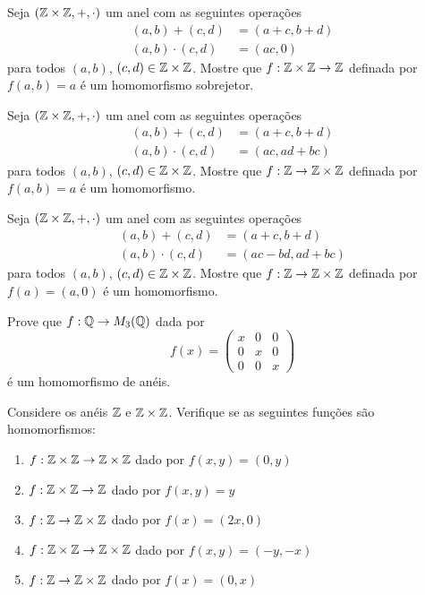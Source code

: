 \documentclass[12pt]{exam}
\begin{document}
\questao{} Seja $(\mathbb{Z}\times\mathbb{Z}, +, \cdot)$ um anel com as seguintes operações
\begin{align*}
	(a, b) + (c, d) &= (a + c, b + d)\\
	(a, b)\cdot (c, d) &= (ac, 0)
\end{align*}
para todos $(a, b)$, $(c, d) \in \mathbb{Z}\times\mathbb{Z}$.
Mostre que $ f : \mathbb{Z}\times\mathbb{Z} \to \mathbb{Z}$ definada por $f(a, b) = a$ é um homomorfismo sobrejetor.

\vspace{.3cm}

\questao{} Seja $(\mathbb{Z}\times\mathbb{Z}, +, \cdot)$ um anel com as seguintes operações
\begin{align*}
	(a, b) + (c, d) &= (a + c, b + d)\\
	(a, b)\cdot (c, d) &= (ac, ad + bc)
\end{align*}
para todos $(a, b)$, $(c, d) \in \mathbb{Z}\times\mathbb{Z}$.
Mostre que $ f : \mathbb{Z} \to \mathbb{Z}\times\mathbb{Z}$ definada por $f(a, b) = a$ é um homomorfismo.

\vspace{.3cm}

\questao{} Seja $(\mathbb{Z}\times\mathbb{Z}, +, \cdot)$ um anel com as seguintes operações
\begin{align*}
	(a, b) + (c, d) &= (a + c, b + d)\\
	(a, b)\cdot (c, d) &= (ac - bd, ad + bc)
\end{align*}
para todos $(a, b)$, $(c, d) \in \mathbb{Z}\times\mathbb{Z}$.
Mostre que $ f : \mathbb{Z} \to \mathbb{Z}\times\mathbb{Z}$ definada por $f(a) = (a, 0)$ é um homomorfismo.

\vspace{.3cm}

\questao{} Prove que $f : \mathbb{Q} \to M_3(\mathbb{Q})$ dada por
\[
	f(x) = \begin{pmatrix}
		x & 0 & 0\\
		0 & x & 0\\
		0 & 0 & x
	\end{pmatrix}
\]
\'e um homomorfismo de an\'eis.

\vspace{.3cm}

 Considere os an{\'e}is $\mathbb{Z}$ e $\mathbb{Z}\times \mathbb{Z}$. Verifique se as seguintes fun\c{c}\~oes s{\~a}o homomorfismos:
\begin{enumerate}[label=({\alph*})]
\item $f : \mathbb{Z}\times\mathbb{Z} \to \mathbb{Z}\times\mathbb{Z}$ dado por $f(x,y) = (0,y)$
\item $f : \mathbb{Z}\times\mathbb{Z} \to \mathbb{Z}$ dado por $f(x,y) = y$
\item $f : \mathbb{Z}\to \mathbb{Z}\times\mathbb{Z}$ dado por $f(x) = (2x,0)$
\item $f : \mathbb{Z}\times\mathbb{Z} \to \mathbb{Z}\times\mathbb{Z}$ dado por $f(x,y) = (-y,-x)$
\item $f : \mathbb{Z} \to \mathbb{Z}\times\mathbb{Z}$ dado por $f(x) = (0,x)$
\end{enumerate}
\end{document}
